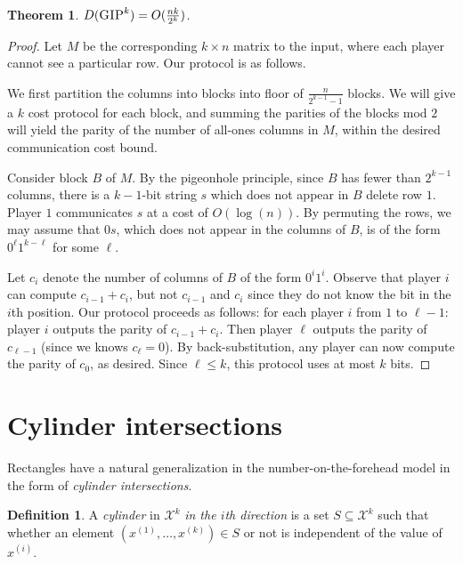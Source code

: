 \documentclass[11pt]{amsart}
\theoremstyle{plain}
\newtheorem{theorem}{Theorem}
\theoremstyle{definition}
\newtheorem{definition}{Definition}
\theoremstyle{plain}
\newcommand{\calX}{\mathcal{X}}
\newcommand{\GIP}{\textsc{GIP}}
\begin{document}
\begin{theorem}
$D(\GIP^k) = O(\frac{nk}{2^k})$.
\end{theorem}

\begin{proof}
Let $M$ be the corresponding $k\times n$ matrix to the input, where each player cannot see a particular row. Our protocol is as follows.

We first partition the columns into blocks into floor of $\frac{n}{2^{k-1}-1}$ blocks. We will give a $k$ cost protocol for each block, and summing the parities of the blocks mod $2$ will yield the parity of the number of all-ones columns in $M$, within the desired communication cost bound.

Consider block $B$ of $M$. By the pigeonhole principle, since $B$ has fewer than $2^{k-1}$ columns, there is a $k-1$-bit string $s$ which does not appear in $B$ delete row $1$. Player $1$ communicates $s$ at a cost of $O(\log(n))$. By permuting the rows, we may assume that $0s$, which does not appear in the columns of $B$, is of the form $0^\ell 1^{k-\ell}$ for some $\ell$.

Let $c_i$ denote the number of columns of $B$ of the form $0^i1^i$. Observe that player $i$ can compute $c_{i-1} + c_i$, but not $c_{i-1}$ and $c_i$ since they do not know the bit in the $i$th position. Our protocol proceeds as follows: for each player $i$ from $1$ to $\ell-1$: player $i$ outputs the parity of $c_{i-1} + c_i$. Then player $\ell$ outputs the parity of  $c_{\ell - 1}$ (since we knows $c_\ell = 0$). By back-substitution, any player can now compute the parity of $c_0$, as desired. Since $\ell \leq k$, this protocol uses at most $k$ bits.
\end{proof}



\newpage 
\section{Cylinder intersections}

Rectangles have a natural generalization in the number-on-the-forehead model in the form of \emph{cylinder intersections}.

\begin{definition}
A \emph{cylinder} in $\calX^k$ \emph{in the $i$th direction} is a set $S \subseteq \calX^k$ such that whether an element $(x^{(1)},\ldots,x^{(k)}) \in S$ or not is independent of the value of $x^{(i)}$.
\end{definition}
\end{document}

